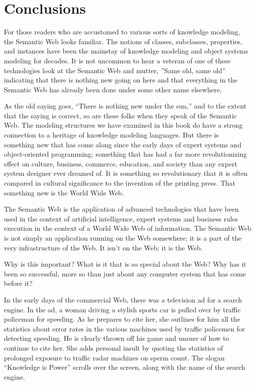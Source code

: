 \chapter{Conclusions}
\label{ch17}



For those readers who are accustomed to various sorts of knowledge
modeling, the Semantic Web looks familiar. The notions of classes,
subclasses, properties, and instances have been the mainstay of
knowledge modeling and object systems modeling for decades. It is not
uncommon to hear a veteran of one of these technologies look at the
Semantic Web and mutter, ''Same old, same old'' indicating that there
is nothing new going on here and that everything in the Semantic Web has
already been done under some other name elsewhere.

As the old saying goes, ``There is nothing new under the sun,'' and to
the extent that the saying is correct, so are these folks when they
speak of the Semantic Web. The modeling structures we have examined in
this book do have a strong connection to a heritage of knowledge
modeling languages. But there is something new that has come along since
the early days of expert systems and object-oriented programming;
something that has had a far more revolutionizing effect on culture,
business, commerce, education, and society than any expert system
designer ever dreamed of. It is something so revolutionary that it is
often compared in cultural significance to the invention of the printing
press. That something new is the World Wide Web.

The Semantic Web is the application of advanced technologies that have
been used in the context of artificial intelligence, expert systems and
business rules execution in the context of a World Wide Web of
information. The Semantic Web is not simply an application running on
the Web somewhere; it is a part of the very infrastructure of the Web.
It isn't on the Web; it is the Web.

Why is this important? What is it that is so special about the Web? Why
has it been so successful, more so than just about any computer system
that has come before it?

In the early days of the commercial Web, there was a television ad for a
search engine. In the ad, a woman driving a stylish sports car is pulled
over by traffic policeman for speeding. As he prepares to cite her, she
outlines for him all the statistics about error rates in the various
machines used by traffic policemen for detecting speeding. He is clearly
thrown off his game and unsure of how to continue to cite her. She adds
personal insult by quoting the statistics of prolonged exposure to
traffic radar machines on sperm count. The slogan ``Knowledge is Power''
scrolls over the screen, along with the name of the search engine.

